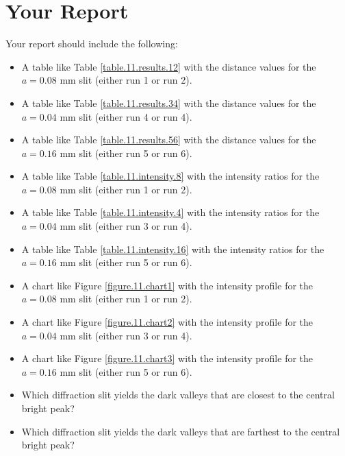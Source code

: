 \section{Your Report}
Your report should include the following:
\begin{itemize}
    \item A table like Table \ref{table.11.results.12} with the distance values for the $a = 0.08$ mm slit (either run 1 or run 2).
    \item A table like Table \ref{table.11.results.34} with the distance values for the $a = 0.04$ mm slit (either run 4 or run 4).
    \item A table like Table \ref{table.11.results.56} with the distance values for the $a = 0.16$ mm slit (either run 5 or run 6).
    \item A table like Table \ref{table.11.intensity.8} with the intensity ratios for the $a = 0.08$ mm slit (either run 1 or run 2).
    \item A table like Table \ref{table.11.intensity.4} with the intensity ratios for the $a = 0.04$ mm slit (either run 3 or run 4).
    \item A table like Table \ref{table.11.intensity.16} with the intensity ratios for the $a = 0.16$ mm slit (either run 5 or run 6).
    \item A chart like Figure \ref{figure.11.chart1} with the intensity profile for the $a = 0.08$ mm slit (either run 1 or run 2).
    \item A chart like Figure \ref{figure.11.chart2} with the intensity profile for the $a = 0.04$ mm slit (either run 3 or run 4).
    \item A chart like Figure \ref{figure.11.chart3} with the intensity profile for the $a = 0.16$ mm slit (either run 5 or run 6).
    \item Which diffraction slit yields the dark valleys that are closest to the central bright peak?
    \item Which diffraction slit yields the dark valleys that are farthest to the central bright peak?
\end{itemize}
\newpage
